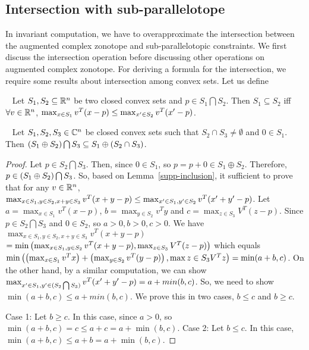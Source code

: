 \subsection{Intersection with sub-parallelotope}
In invariant computation, we have to overapproximate the intersection
between the augmented complex zonotope and sub-parallelotopic
constraints.  We first discuss the intersection operation before
discussing other operations on augmented complex zonotope.  For
deriving a formula for the intersection, we require some results about
intersection among convex sets.  Let us define 
%
\begin{lemma}~\label{supp-inclusion}
Let $S_1,S_2\subseteq \mathbb{R}^n$ be two closed convex sets and $p\in S_1\bigcap S_2$.
Then $S_1\subseteq S_2$ iff $\forall v\in\mathbb{R}^n$, $\max_{x\in
  S_1}v^T(x-p) \leq \max_{x^\prime\in S_2}v^T(x^\prime-p)$.
\end{lemma}
%
\begin{lemma}~\label{gen-inc}
Let $S_1,S_2,S_3\in\mathbb{C}^n$ be closed convex sets such that
$S_2\cap S_3\neq \emptyset$ and $0\in S_1$.  Then $\left(S_1\oplus S_2\right)\bigcap
S_3\subseteq S_1\oplus\left(S_2\cap S_3\right)$.
\end{lemma}
\begin{proof}
 Let $p\in S_2\bigcap S_3$.
Then, since $0\in S_1$, so $p=p+0\in S_1\oplus S_2$.  Therefore, $p\in
\left(S_1\oplus S_2\right)\bigcap S_3$.  So, based on
Lemma~\ref{supp-inclusion}, it sufficient to prove that for any
$v\in\mathbb{R}^n$, $\max_{x\in S_1,y\in S_2,x+y\in S_3}v^T(x+y-p) \leq
\max_{x^\prime\in S_1,y^\prime\in S_2}v^T(x^\prime+y^\prime-p)$.  Let $a =
\max_{x\in S_1}v^T(x-p)$, $b=\max_{y\in S_2}v^Ty$ and $c = \max_{z\in
  S_3}V^T(z-p)$.  Since $p\in S_2\bigcap S_3$ and $0\in S_2$, so
$a>0,b>0,c>0$.  We have $\max_{x\in S_1,y\in S_2,x+y\in S_3}v^T(x+y-p)$
$= \min\left(\max_{x\in S_1,y\in S_2}v^T(x+y-p),\max_{z\in
  S_3}V^T(z-p)\right)$ which equals\\ $\min\left(\left(\max_{x\in
  S_1}v^Tx\right)+\left(\max_{y\in S_2}v^T(y-p)\right),\max{z\in S_3}V^Tz\right)
= \min(a+b,c)$.  On the other hand, by a similar computation, we can
show $\max_{x^\prime\in S_1,y^\prime\in (S_2\bigcap S_3)}v^T(x^\prime+y^\prime-p)
= a+min(b,c)$.  So, we need to show $\min(a+b,c)\leq a+min(b,c)$.  We
prove this in two cases, $b\leq c$ and $b\geq c$.


Case 1: Let $b\geq c$.  In this case, since $a>0$, so
$\min(a+b,c) = c \leq a+c = a+\min(b,c)$.
Case 2: Let $b\leq c$.  In this case, $\min(a+b,c)\leq a+b = a+\min(b,c)$.
\end{proof}

